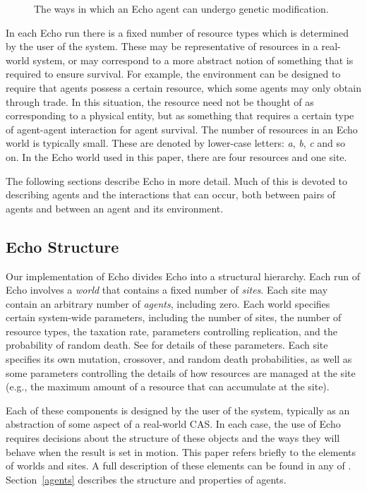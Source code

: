 \begin{figure}[htb]
\begin{center}
\leavevmode
\epsfysize=3in
\caption{The ways in which an Echo agent can undergo genetic modification.
\label{fig:agent-evolution}}
\end{center}
\end{figure}


In each Echo run there is a fixed number of resource types which is
determined by the user of the system. These may be representative of
resources in a real-world system, or may correspond to a more abstract
notion of something that is required to ensure survival.  For example,
the environment can be designed to require that agents possess a
certain resource, which some agents may only obtain through trade. In
this situation, the resource need not be thought of as corresponding
to a physical entity, but as something that requires a certain type of
agent-agent interaction for agent survival. The number of resources in
an Echo world is typically small. These are denoted by lower-case
letters: {\em a}, {\em b}, {\em c\/} and so on. In the Echo world used
in this paper, there are four resources and one site.

The following sections describe Echo in more detail. Much of this is
devoted to describing agents and the interactions that can occur, both
between pairs of agents and between an agent and its environment.

\subsection{Echo Structure}

Our implementation of Echo divides Echo into a structural hierarchy.
Each run of Echo involves a {\em world\/} that contains a fixed number
of {\em sites\/}.  Each site may contain an arbitrary number of {\em
agents}, including zero.  Each world specifies certain system-wide
parameters, including the number of sites, the number of resource
types, the taxation rate, parameters controlling replication, and the
probability of random death.  See \cite{JonesForrest93} for details of
these parameters.  Each site specifies its own mutation, crossover,
and random death probabilities, as well as some parameters controlling
the details of how resources are managed at the site (e.g., the
maximum amount of a resource that can accumulate at the site).

Each of these components is designed by the user of the system,
typically as an abstraction of some aspect of a real-world CAS.  In each
case, the use of Echo requires decisions about the structure of these
objects and the ways they will behave when the result is set in
motion.  This paper refers briefly to the elements of worlds and
sites.  A full description of these elements can be found in any of
\cite{JonesForrest93,Holland92,Holland94}.  Section~\ref{agents}
describes the structure and properties of agents.

